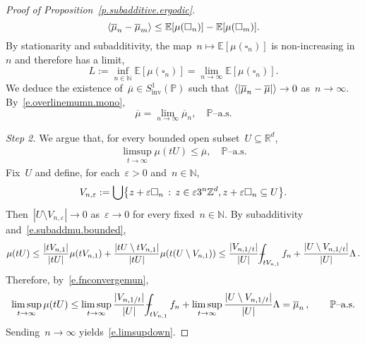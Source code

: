 \documentclass[11pt,twoside]{article} %
\let\oldsquare\square %
\renewcommand{\square}{\oldsquare}
\numberwithin{equation}{section}
\theoremstyle{definition}
\let\originalleft\left
\let\originalright\right
\renewcommand{\left}{\mathopen{}\mathclose\bgroup\originalleft}
\renewcommand{\right}{\aftergroup\egroup\originalright}
\newcommand*{\N}{\ensuremath{\mathbb{N}}}
\newcommand*{\Zd}{\ensuremath{\mathbb{Z}^d}}
\newcommand*{\Rd}{\ensuremath{\mathbb{R}^d}}
\newcommand{\eps}{\varepsilon}
\newcommand{\ep}{\eps}
\newcommand{\inv}{\mathrm{inv}}
\newcommand{\cu}{\square}
\renewcommand{\P}{\mathbb{P}}
\newcommand{\E}{\mathbb{E}}
\def\Xint#1{\mathchoice
{\XXint\displaystyle\textstyle{#1}}%
{\XXint\textstyle\scriptstyle{#1}}%
{\XXint\scriptstyle\scriptscriptstyle{#1}}%
{\XXint\scriptscriptstyle\scriptscriptstyle{#1}}%
\!\int}
\def\XXint#1#2#3{{\setbox0=\hbox{$#1{#2#3}{\int}$}
\vcenter{\hbox{$#2#3$}}\kern-.5\wd0}}
\def\fint{\Xint-}
\begin{document}
\begin{proof}[{Proof of Proposition~\ref{p.subadditive.ergodic}}]
\begin{equation*}
\langle \overline{\mu}_n - \overline{\mu}_m \rangle
\leq 
\E \left[ \mu(\cu_n) \right] 
-
\E \left[ \mu(\cu_m) \right].
\end{equation*}
By stationarity and subadditivity, the map~$n\mapsto \E[\mu(\cu_n)]$ is non-increasing in~$n$ and therefore has a limit,
\begin{equation}
\label{e.LEcunlim}
L:= \inf_{n\in\N} \E[\mu(\cu_n)] = \lim_{n\to \infty} \E[\mu(\cu_n)]. 
\end{equation}
We deduce the existence of~$\overline{\mu} \in S^1_\inv(\P)$ such that~$\langle \left| \overline{\mu}_n - \overline{\mu} \right| \rangle \to 0$ as~$n \to \infty$. By~\eqref{e.overlinemumn.mono},
\begin{equation}
\label{e.overlinemulim}
\overline{\mu} = \lim_{n\to \infty} \overline{\mu}_n, \quad \mbox{$\P$--a.s.}
\end{equation}

\emph{Step 2.}
We argue that, for every bounded open subset~$U\subseteq\Rd$, 
\begin{align}
\label{e.limsupdown}
\limsup_{t\to \infty} \mu(t U) \leq \overline{\mu}, 
\quad \mbox{$\P$--a.s.}
\end{align}
Fix~$U$ and define, for each~$\ep>0$ and~$n\in\N$, \begin{align*}
V_{n,\ep} := \bigcup \left\{ z+\ep \cu_n \,:\, z\in \ep3^n \Zd , z+\ep\cu_n \subseteq U \right\}. 
\end{align*}
Then~$|U \setminus V_{n,\ep}| \to 0$ as~$\ep \to 0$ for every fixed~$n\in\N$. 
By subadditivity and~\eqref{e.subaddmu.bounded},  
\begin{equation*}
\mu(tU)
\leq 
\frac{|tV_{n,1}|}{|tU|} \mu(tV_{n,1})+ \frac{|tU \setminus tV_{n,1}|}{|tU|}  \mu(t(U\setminus V_{n,1}))
\leq
\frac{|V_{n,1/t}|}{|U|} \fint_{tV_{n,1}} f_n +  \frac{|U \setminus V_{n,1/t}|}{|U|} \Lambda
\,.
\end{equation*}
Therefore, by~\eqref{e.fnconvergemun},
\begin{equation*}
\limsup_{t\to \infty} \mu(tU) 
\leq 
\limsup_{t\to \infty}
\frac{|V_{n,1/t}|}{|U|} \fint_{tV_{n,1}} f_n 
+ 
\limsup_{t\to \infty} \frac{|U \setminus V_{n,1/t}|}{|U|} \Lambda
=
\overline{\mu}_n
\,,
\qquad 
\mbox{$\P$--a.s.}
\end{equation*}
Sending~$n\to \infty$ yields~\eqref{e.limsupdown}. 

\smallskip


\end{proof}
\end{document}
